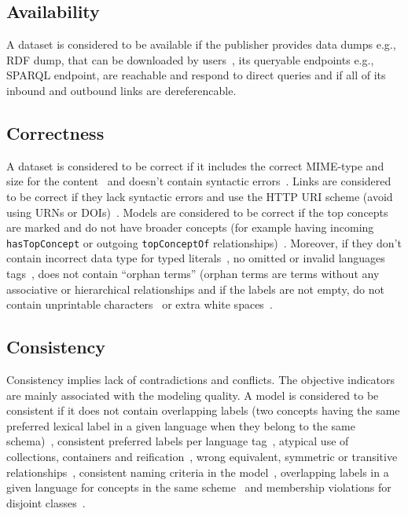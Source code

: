 \documentclass[onecolumn, crcready]{../../Util/LaTEX/iosart2c}
\begin{document}
\subsection{Availability}
A dataset is considered to be available if the publisher provides data dumps e.g., RDF dump, that can be downloaded by users~\cite{Flemming:Thesis:10,Hogan:LDOW:10}, its queryable endpoints e.g., SPARQL endpoint, are reachable and respond to direct queries and if all of its inbound and outbound links are dereferencable.

\subsection{Correctness}
A dataset is considered to be correct if it includes the correct MIME-type and size for the content~\cite{Hogan:LDOW:10} and doesn't contain syntactic errors~\cite{Hogan:LDOW:10}. Links are considered to be correct if they lack syntactic errors and use the HTTP URI scheme (avoid using URNs or DOIs)~\cite{Mader:TBDL:12}. Models are considered to be correct if the top concepts are marked and do not have broader concepts (for example having incoming \texttt{hasTopConcept} or outgoing \texttt{topConceptOf} relationships)~\cite{Mader:TBDL:12}. Moreover, if they don't contain incorrect data type for typed literals~\cite{Hogan:LDOW:10}\cite{Acosta:ISWC:13}, no omitted or invalid languages tags~\cite{Suominen:IKEM:12,Mader:TBDL:12}, does not contain ``orphan terms'' (orphan terms are terms without any associative or hierarchical relationships and if the labels are not empty, do not contain unprintable characters~\cite{Acosta:ISWC:13,Mader:TBDL:12} or extra white spaces~\cite{Suominen:IKEM:12}.

\subsection{Consistency}
Consistency implies lack of contradictions and conflicts. The objective indicators are mainly associated with the modeling quality. A model is considered to be consistent if it does not contain overlapping labels (two concepts having the same preferred lexical label in a given language when they belong to the same schema)~\cite{Isaac:W3C:09,Mader:TBDL:12}, consistent preferred labels per language tag~\cite{Mader:TBDL:12,Suominen:IKEM:12}, atypical use of collections, containers and reification~\cite{Hogan:LDOW:10}, wrong equivalent, symmetric or transitive relationships~\cite{Maria:KEOD:13}, consistent naming criteria in the model~\cite{Mader:TBDL:12,Maria:KEOD:13}, overlapping labels in a given language for concepts in the same scheme~\cite{Mader:TBDL:12} and membership violations for disjoint classes~\cite{Hogan:LDOW:10,Maria:KEOD:13}.
\end{document}
